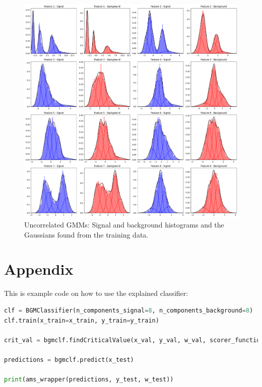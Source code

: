 \begin{figure}
    \centering
    \includegraphics[width=\textwidth]{img/tightfit.png}
    \caption{Uncorrelated GMMs: Signal and background histograms and the Gaussians found from the training data.}
    \label{fig:enter-label}
\end{figure}



\clearpage


\appendix

\section{Appendix}


This is example code on how to use the explained classifier:

\begin{lstlisting}[language=Python]
clf = BGMClassifier(n_components_signal=8, n_components_background=8)
clf.train(x_train=x_train, y_train=y_train)

crit_val = bgmclf.findCriticalValue(x_val, y_val, w_val, scorer_function=ams_wrapper, num_points=100)

predictions = bgmclf.predict(x_test)

print(ams_wrapper(predictions, y_test, w_test))
\end{lstlisting}


